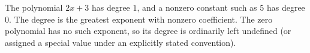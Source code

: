 The polynomial $2x+3$ has degree $\boxed1$, and a nonzero constant such as $5$ has degree $\boxed0$. The degree is the greatest exponent with nonzero coefficient. The zero polynomial has no such exponent, so its degree is ordinarily left undefined (or assigned a special value under an explicitly stated convention).
